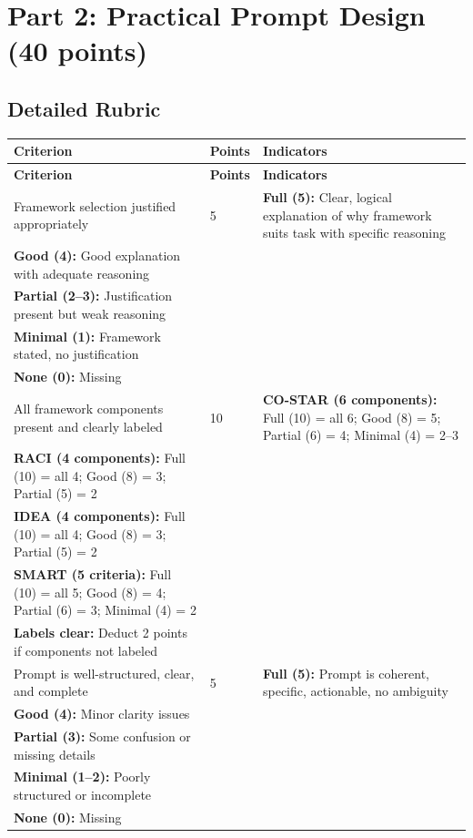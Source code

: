 \documentclass[11pt]{article}
\begin{document}
\section{Part 2: Practical Prompt Design (40 points)}

\subsection*{Detailed Rubric}

\begin{longtable}{|p{5cm}|p{2cm}|p{8cm}|}
\hline
\textbf{Criterion} & \textbf{Points} & \textbf{Indicators} \\
\hline
\endfirsthead
\hline
\textbf{Criterion} & \textbf{Points} & \textbf{Indicators} \\
\hline
\endhead

Framework selection justified appropriately & 5 & 
\textbf{Full (5):} Clear, logical explanation of why framework suits task with specific reasoning \\
\textbf{Good (4):} Good explanation with adequate reasoning \\
\textbf{Partial (2--3):} Justification present but weak reasoning \\
\textbf{Minimal (1):} Framework stated, no justification \\
\textbf{None (0):} Missing \\
\hline

All framework components present and clearly labeled & 10 & 
\textbf{CO-STAR (6 components):} Full (10) = all 6; Good (8) = 5; Partial (6) = 4; Minimal (4) = 2--3 \\
\textbf{RACI (4 components):} Full (10) = all 4; Good (8) = 3; Partial (5) = 2 \\
\textbf{IDEA (4 components):} Full (10) = all 4; Good (8) = 3; Partial (5) = 2 \\
\textbf{SMART (5 criteria):} Full (10) = all 5; Good (8) = 4; Partial (6) = 3; Minimal (4) = 2 \\
\textbf{Labels clear:} Deduct 2 points if components not labeled \\
\hline

Prompt is well-structured, clear, and complete & 5 & 
\textbf{Full (5):} Prompt is coherent, specific, actionable, no ambiguity \\
\textbf{Good (4):} Minor clarity issues \\
\textbf{Partial (3):} Some confusion or missing details \\
\textbf{Minimal (1--2):} Poorly structured or incomplete \\
\textbf{None (0):} Missing \\
\hline


\end{longtable}
\end{document}
